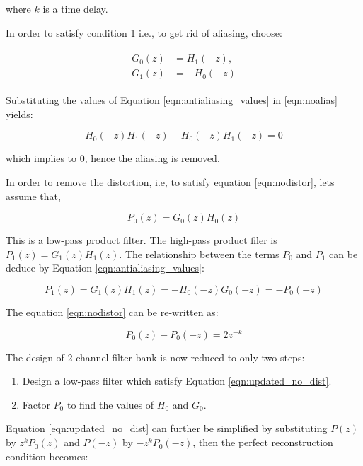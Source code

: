 where $k$ is a time delay.

In order to satisfy condition 1 i.e., to get rid of aliasing, choose:

\begin{align}
	\label{eqn:antialiasing_values}
	\begin{split}
		G_0(z) &=  H_1(-z), \\ 
		G_1(z) &=  -H_0(-z)
	\end{split}
\end{align}

Substituting the values of Equation \ref{eqn:antialiasing_values} in  \ref{eqn:noalias} yields:

\begin{equation} \label{eqn:aliasrem}
{H_{0}(-z)H_1(-z)-H_0(-z)H_{1}(-z) = 0}
\end{equation}

which implies to 0, hence the aliasing is removed.

In order to remove the distortion, i.e, to satisfy equation \ref{eqn:nodistor}, lets assume that,

\begin{equation}\label{eqn:p0} 
{P_0(z)=G_{0}(z)H_{0}(z)}
\end{equation}

This is a low-pass product filter. The high-pass product filer is ${P_1(z)=G_{1}(z)H_{1}(z)}$. The relationship between the terms $P_0$ and $P_1$ can be deduce by Equation \ref{eqn:antialiasing_values}:

\begin{equation} 
{P_1(z) = G_{1}(z)H_{1}(z) = -H_{0}(-z)G_{0}(-z) = -P_0(-z)}
\end{equation}

The equation \ref{eqn:nodistor} can be re-written as:

\begin{equation}\label{eqn:updated_no_dist} 
{P_0(z) - P_0(-z) =  2z^{-k}}
\end{equation}

The design of 2-channel filter bank is now reduced to only two steps:

\begin{enumerate}
	\item Design a low-pass filter which satisfy Equation \ref{eqn:updated_no_dist}.
	\item Factor $P_0$ to find the values of $H_0$ and $G_0$.
\end{enumerate}

Equation \ref{eqn:updated_no_dist} can further be simplified by substituting $P(z)$ by $z^kP_0(z)$ and $P(-z)$ by $-z^kP_0(-z)$, then the perfect reconstruction condition becomes:


